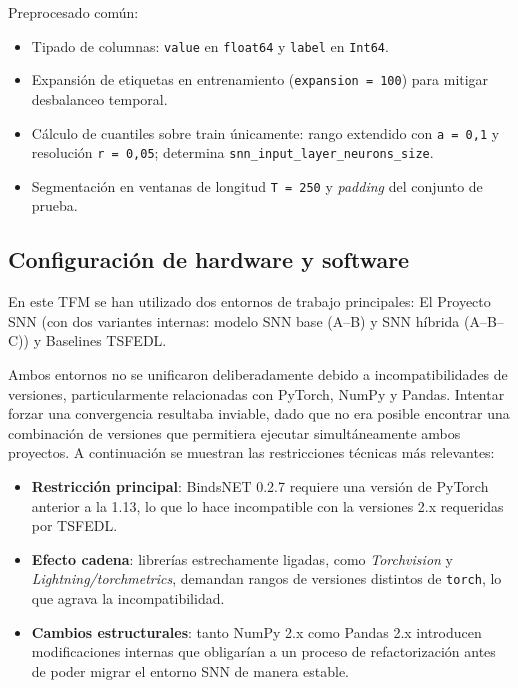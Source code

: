 Preprocesado común:
\begin{itemize}
    \item Tipado de columnas: \texttt{value} en \texttt{float64} y \texttt{label} en \texttt{Int64}.
    \item Expansión de etiquetas en entrenamiento (\texttt{expansion = 100}) para mitigar desbalanceo temporal.
    \item Cálculo de cuantiles sobre train únicamente: rango extendido con \texttt{a = 0{,}1} y resolución \texttt{r = 0{,}05}; determina \texttt{snn\_input\_layer\_neurons\_size}.
    \item Segmentación en ventanas de longitud \texttt{T = 250} y \textit{padding} del conjunto de prueba.
\end{itemize}

\subsection{Configuración de hardware y software}
\label{subsec:config_hw_sw}

En este TFM se han utilizado dos entornos de trabajo principales: El Proyecto SNN (con dos variantes internas: modelo SNN base (A–B) y SNN híbrida (A–B–C)) y Baselines TSFEDL.

Ambos entornos no se unificaron deliberadamente debido a incompatibilidades de versiones, particularmente relacionadas con PyTorch, NumPy y Pandas. Intentar forzar una convergencia resultaba inviable, dado que no era posible encontrar una combinación de versiones que permitiera ejecutar simultáneamente ambos proyectos. A continuación se muestran las restricciones técnicas más relevantes:

\begin{itemize}
    \item \textbf{Restricción principal}: BindsNET 0.2.7 requiere una versión de PyTorch anterior a la 1.13, lo que lo hace incompatible con la versiones 2.x requeridas por TSFEDL.
    \item \textbf{Efecto cadena}: librerías estrechamente ligadas, como \textit{Torchvision} y \textit{Lightning/torchmetrics}, demandan rangos de versiones distintos de \texttt{torch}, lo que agrava la incompatibilidad.
    \item \textbf{Cambios estructurales}: tanto NumPy 2.x como Pandas 2.x introducen modificaciones internas que obligarían a un proceso de refactorización antes de poder migrar el entorno SNN de manera estable.
\end{itemize}

